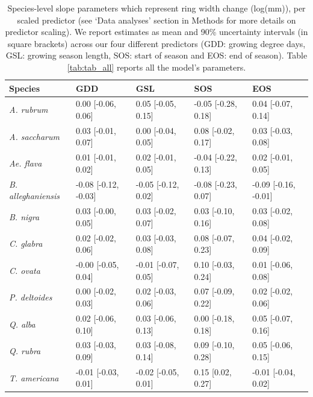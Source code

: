 \begin{table}[ht]
\centering
\caption{Species-level slope parameters which represent ring width change (log(mm)), per scaled predictor (see `Data analyses' section in Methods for more details on predictor scaling). We report estimates as mean and 90\% uncertainty intervals (in square brackets) across our four different predictors (GDD: growing degree days, GSL: growing season length, SOS: start of season and EOS: end of season). Table \ref{tab:tab_all} reports all the model's parameters.} 
\label{tab:ts_slope_table}
\begin{tabular}{lllll}
  \hline
Species & GDD & GSL & SOS & EOS \\ 
  \hline
\textit{A. rubrum} & 0.00 [-0.06, 0.06] & 0.05 [-0.05, 0.15] & -0.05 [-0.28, 0.18] & 0.04 [-0.07, 0.14] \\ 
  \textit{A. saccharum} & 0.03 [-0.01, 0.07] & 0.00 [-0.04, 0.05] & 0.08 [-0.02, 0.17] & 0.03 [-0.03, 0.08] \\ 
  \textit{Ae. flava} & 0.01 [-0.01, 0.02] & 0.02 [-0.01, 0.05] & -0.04 [-0.22, 0.13] & 0.02 [-0.01, 0.05] \\ 
  \textit{B. alleghaniensis} & -0.08 [-0.12, -0.03] & -0.05 [-0.12, 0.02] & -0.08 [-0.23, 0.07] & -0.09 [-0.16, -0.01] \\ 
  \textit{B. nigra} & 0.03 [-0.00, 0.05] & 0.03 [-0.02, 0.07] & 0.03 [-0.10, 0.16] & 0.03 [-0.02, 0.08] \\ 
  \textit{C. glabra} & 0.02 [-0.02, 0.06] & 0.03 [-0.03, 0.08] & 0.08 [-0.07, 0.23] & 0.04 [-0.02, 0.09] \\ 
  \textit{C. ovata} & -0.00 [-0.05, 0.04] & -0.01 [-0.07, 0.05] & 0.10 [-0.03, 0.24] & 0.01 [-0.06, 0.08] \\ 
  \textit{P. deltoides} & 0.00 [-0.02, 0.03] & 0.02 [-0.03, 0.06] & 0.07 [-0.09, 0.22] & 0.02 [-0.02, 0.06] \\ 
  \textit{Q. alba} & 0.02 [-0.06, 0.10] & 0.03 [-0.06, 0.13] & 0.00 [-0.18, 0.18] & 0.05 [-0.07, 0.16] \\ 
  \textit{Q. rubra} & 0.03 [-0.03, 0.09] & 0.03 [-0.08, 0.14] & 0.09 [-0.10, 0.28] & 0.05 [-0.06, 0.15] \\ 
  \textit{T. americana} & -0.01 [-0.03, 0.01] & -0.02 [-0.05, 0.01] & 0.15 [0.02, 0.27] & -0.01 [-0.04, 0.02] \\ 
   \hline
\end{tabular}
\end{table}



